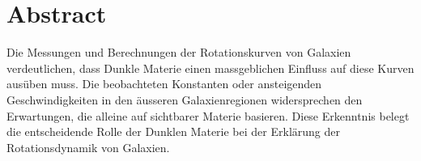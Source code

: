 
\section*{Abstract}

Die Messungen und Berechnungen der Rotationskurven von Galaxien verdeutlichen, dass Dunkle Materie einen massgeblichen Einfluss auf diese Kurven ausüben muss. Die beobachteten Konstanten oder ansteigenden Geschwindigkeiten in den äusseren Galaxienregionen widersprechen den Erwartungen, die alleine auf sichtbarer Materie basieren. Diese Erkenntnis belegt die entscheidende Rolle der Dunklen Materie bei der Erklärung der Rotationsdynamik von Galaxien.
